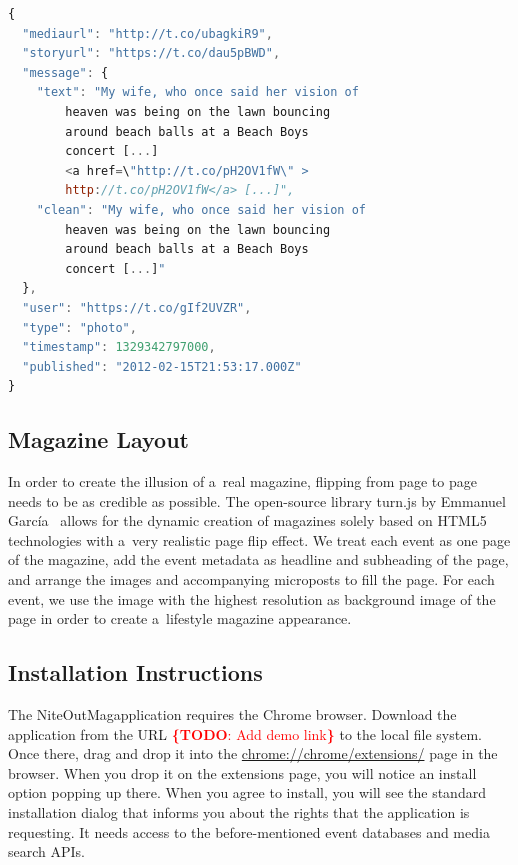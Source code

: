 \documentclass{acm_proc_article-sp}
\newcommand{\todo}[1]{\noindent\textcolor{red}{{\bf \{TODO}: #1{\bf \}}}}
\begin{document}
\begin{lstlisting}[language=JavaScript,caption={Sample output of the media collector showing a~\mbox{Google+} post (edited for legibility, URLs shortened).},label={lst:media}]
{
  "mediaurl": "http://t.co/ubagkiR9",
  "storyurl": "https://t.co/dau5pBWD",
  "message": {
    "text": "My wife, who once said her vision of
        heaven was being on the lawn bouncing
        around beach balls at a Beach Boys
        concert [...]
        <a href=\"http://t.co/pH2OV1fW\" >
        http://t.co/pH2OV1fW</a> [...]",
    "clean": "My wife, who once said her vision of
        heaven was being on the lawn bouncing
        around beach balls at a Beach Boys
        concert [...]"
  },
  "user": "https://t.co/gIf2UVZR",
  "type": "photo",
  "timestamp": 1329342797000,
  "published": "2012-02-15T21:53:17.000Z"
}
\end{lstlisting}

\subsection{Magazine Layout}
In order to create the illusion of a~real magazine,
flipping from page to page needs to be as credible as possible.
The open-source library turn.js by Emmanuel García~\cite{TurnJs2012}
allows for the dynamic creation of magazines solely based on HTML5 technologies
with a~very realistic page flip effect.
We treat each event as one page of the magazine,
add the event metadata as headline and subheading of the page,
and arrange the images and accompanying microposts to fill the page.
For each event, we use the image with the highest resolution
as background image of the page in order to create a~lifestyle magazine appearance. 

\subsection{Installation Instructions}
The NiteOutMag\texttrademark application requires the Chrome browser.
Download the application from the URL \todo{Add demo link} to the local file system.
Once there, drag and drop it into the \url{chrome://chrome/extensions/} page in the browser. 
When you drop it on the extensions page, you will notice an install option popping up there.
When you agree to install, you will see the standard installation dialog
that informs you about the rights that the application is requesting.
It needs access to the before-mentioned event databases and media search APIs.
\end{document}
